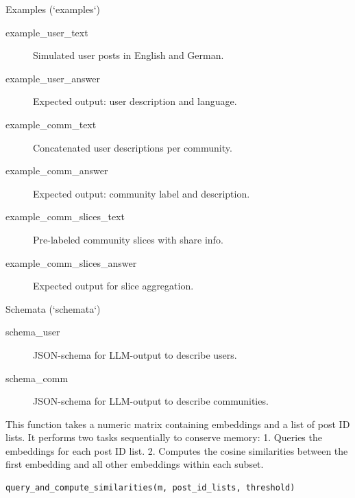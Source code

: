 \documentclass[a4paper]{book}
\begin{document}
\begin{Section}{Examples (`examples`)}

\begin{description}

\item[example\_user\_text] Simulated user posts in English and German.
\item[example\_user\_answer] Expected output: user description and language.
\item[example\_comm\_text] Concatenated user descriptions per community.
\item[example\_comm\_answer] Expected output: community label and description.
\item[example\_comm\_slices\_text] Pre-labeled community slices with share info.
\item[example\_comm\_slices\_answer] Expected output for slice aggregation.

\end{description}

\end{Section}
%
\begin{Section}{Schemata (`schemata`)}

\begin{description}

\item[schema\_user] JSON-schema for LLM-output to describe users.
\item[schema\_comm] JSON-schema for LLM-output to describe communities.

\end{description}

\end{Section}
%
\begin{Description}
This function takes a numeric matrix containing embeddings and a list of post ID lists. 
It performs two tasks sequentially to conserve memory:
1. Queries the embeddings for each post ID list.
2. Computes the cosine similarities between the first embedding and all other embeddings within each subset.
\end{Description}
%
\begin{Usage}
\begin{verbatim}
query_and_compute_similarities(m, post_id_lists, threshold)
\end{verbatim}
\end{Usage}
%
\end{document}
